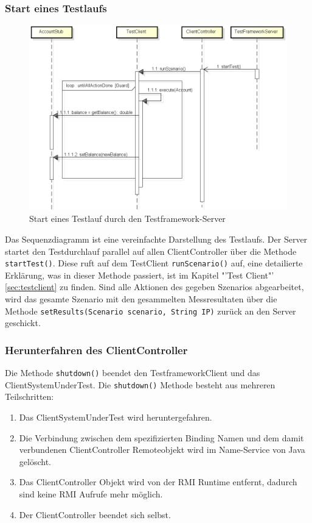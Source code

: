 \subsubsection{Start eines Testlaufs}
\begin{figure}[H]
\begin{center}
\includegraphics[scale=0.55]{image_testFramework/startTest.png}
\end{center}
\caption{Start eines Testlauf durch den Testframework-Server}
\end{figure}
Das Sequenzdiagramm ist eine vereinfachte Darstellung des Testlaufs. Der Server startet den Testdurchlauf parallel auf allen ClientController über die Methode \verb+startTest()+. Diese ruft auf dem TestClient \verb+runScenario()+ auf, eine detailierte Erklärung, was in dieser Methode passiert, ist im Kapitel "'Test Client"' \ref{sec:testclient} zu finden. Sind alle Aktionen des gegeben Szenarios abgearbeitet, wird das gesamte Szenario mit den gesammelten Messresultaten über die Methode \verb+setResults(Scenario scenario, String IP)+ zurück an den Server geschickt.

\subsubsection{Herunterfahren des ClientController}
Die Methode \texttt{shutdown()} be\-endet den Test\-frame\-work\-Client und das Client\-System\-Under\-Test. Die \texttt{shut\allowbreak down()} Me\-tho\-de be\-steht aus mehreren Teil\-schrit\-ten:
\begin{enumerate}
\item Das ClientSystemUnderTest wird heruntergefahren.
\item Die Verbindung zwischen dem spezifizierten Binding Namen und dem damit verbundenen ClientController Remoteobjekt wird im Name-Service von Java gelöscht.
\item Das ClientController Objekt wird von der RMI Run\-time entfernt, da\-durch sind keine RMI Aufrufe mehr möglich.
\item Der ClientController beendet sich selbst.
\end{enumerate}

